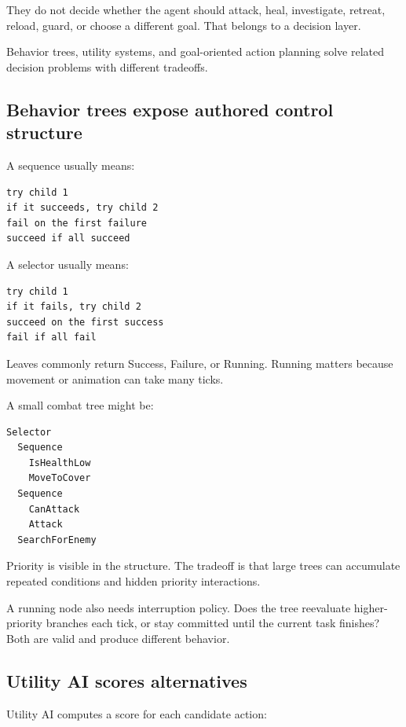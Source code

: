 They do not decide whether the agent should attack, heal, investigate, retreat, reload, guard, or choose a different goal. That belongs to a decision layer.

Behavior trees, utility systems, and goal-oriented action planning solve related decision problems with different tradeoffs.

\subsection{Behavior trees expose authored control structure}\label{06-engine-ii-ch047-behavior-trees-expose-authored-control-structure}

A sequence usually means:

\begin{verbatim}
try child 1
if it succeeds, try child 2
fail on the first failure
succeed if all succeed
\end{verbatim}

A selector usually means:

\begin{verbatim}
try child 1
if it fails, try child 2
succeed on the first success
fail if all fail
\end{verbatim}

Leaves commonly return Success, Failure, or Running. Running matters because movement or animation can take many ticks.

A small combat tree might be:

\begin{verbatim}
Selector
  Sequence
    IsHealthLow
    MoveToCover
  Sequence
    CanAttack
    Attack
  SearchForEnemy
\end{verbatim}

Priority is visible in the structure. The tradeoff is that large trees can accumulate repeated conditions and hidden priority interactions.

A running node also needs interruption policy. Does the tree reevaluate higher-priority branches each tick, or stay committed until the current task finishes? Both are valid and produce different behavior.

\subsection{Utility AI scores alternatives}\label{06-engine-ii-ch047-utility-ai-scores-alternatives}

Utility AI computes a score for each candidate action:

